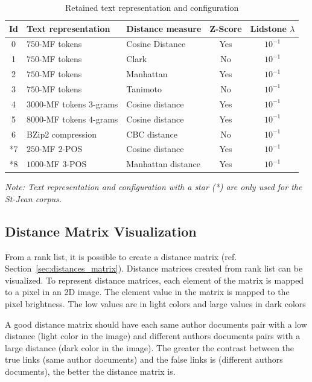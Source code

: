 \begin{table}[!t]
  \centering
  \caption{Retained text representation and configuration}
  \label{tab:9rl}
  \begin{tabular}{c l l c c}
    \toprule
    Id &
    Text representation &
    Distance measure &
    Z-Score &
    Lidstone $\lambda$\\
    \midrule
    0 & $750$-MF tokens & Cosine Distance & Yes & $10^{-1}$\\
    1 & $750$-MF tokens & Clark & No & $10^{-1}$\\
    2 & $750$-MF tokens & Manhattan & Yes & $10^{-1}$\\
    3 & $750$-MF tokens & Tanimoto & No & $10^{-1}$\\
    4 & $3000$-MF tokens $3$-grams & Cosine distance & Yes & $10^{-1}$\\
    5 & $8000$-MF tokens $4$-grams & Cosine distance & Yes & $10^{-1}$\\
    6 & BZip2 compression & CBC distance & No & $10^{-1}$\\
    *7 & $250$-MF $2$-POS & Cosine distance & Yes & $10^{-1}$\\
    *8 & $1000$-MF $3$-POS & Manhattan distance & Yes & $10^{-1}$\\
    \bottomrule
  \end{tabular}

  \vspace{0.2cm}

  \textit{Note: Text representation and configuration with a star (*) are only used for the St-Jean corpus.}\\
\end{table}

\subsection{Distance Matrix Visualization}

From a rank list, it is possible to create a distance matrix (ref. Section~\ref{sec:distances_matrix}).
Distance matrices created from rank list can be visualized.
To represent distance matrices, each element of the matrix is mapped to a pixel in an 2D image.
The element value in the matrix is mapped to the pixel brightness.
The low values are in light colors and large values in dark colors

A good distance matrix should have each same author documents pair with a low distance (light color in the image) and different authors documents pairs with a large distance (dark color in the image).
The greater the contrast between the true links (same author documents) and the false links is (different authors documents), the better the distance matrix is.

